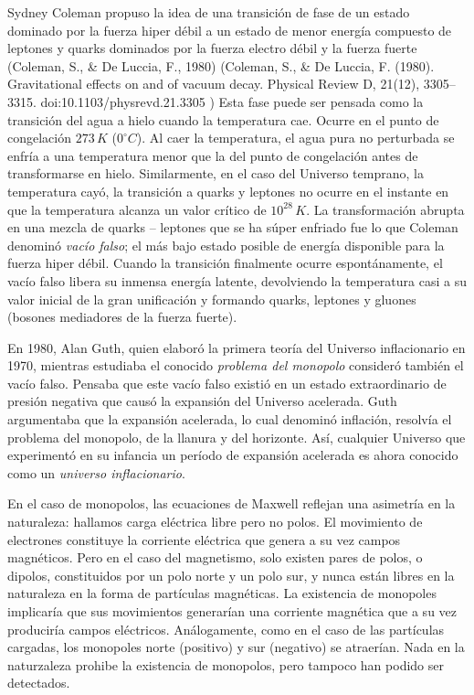 \documentclass[11pt]{article}
\begin{document}
{Sydney Coleman propuso la idea de una transición de fase de un estado dominado por la fuerza hiper débil a un estado de menor energía compuesto de leptones y quarks dominados por la fuerza electro débil y la fuerza fuerte (Coleman, S., \& De Luccia, F., 1980) (Coleman, S., \& De Luccia, F. (1980). Gravitational effects on and of vacuum decay. Physical Review D, 21(12), 3305–3315. doi:10.1103/physrevd.21.3305 )
Esta fase puede ser pensada como la transición del agua a hielo cuando la temperatura cae. Ocurre en el punto de congelación $273 \, K$ ($0^{\circ}C$). Al caer la temperatura, el agua pura no perturbada se enfría a una temperatura menor que la del punto de congelación antes de transformarse en hielo. Similarmente, en el caso del Universo temprano, la temperatura cayó, la transición a quarks y leptones no ocurre en el instante en que la temperatura alcanza un valor crítico de $10^{28} \,K$. La transformación abrupta en una mezcla de quarks – leptones que se ha súper enfriado fue lo que Coleman denominó {\textit{vacío falso}}; el más bajo estado posible de energía disponible para la fuerza hiper débil. Cuando la transición finalmente  ocurre espontánamente, el vacío falso libera su inmensa energía latente, devolviendo la temperatura casi a su valor inicial de la gran unificación y formando quarks, leptones y gluones (bosones mediadores de la fuerza fuerte). 

En 1980, Alan Guth, quien elaboró la primera teoría del Universo inflacionario en 1970, mientras estudiaba el conocido {\textit{problema del monopolo}} consideró también el vacío falso. Pensaba que este vacío falso existió en un estado extraordinario de presión negativa que causó la expansión del Universo acelerada. Guth argumentaba que la expansión acelerada, lo cual denominó inflación, resolvía el problema del monopolo, de la llanura y del horizonte. Así, cualquier Universo que experimentó en su infancia un período de expansión acelerada es ahora conocido como un {\textit{universo inflacionario}}.

En el caso de monopolos, las ecuaciones de Maxwell reflejan una asimetría en la naturaleza: hallamos carga eléctrica libre pero no polos. El movimiento de electrones constituye la corriente eléctrica que genera a su vez campos magnéticos. Pero en el caso del magnetismo, solo existen pares de polos, o dipolos, constituidos por un polo norte y un polo sur, y nunca están libres en la naturaleza en la forma de partículas magnéticas. La existencia de monopoles implicaría que sus movimientos generarían una corriente magnética que a su vez produciría campos eléctricos. Análogamente, como en el caso de las partículas cargadas, los monopoles norte (positivo) y sur (negativo) se atraerían. Nada en la naturzaleza prohibe la existencia de monopolos, pero tampoco han podido ser detectados. 

}
\end{document}
